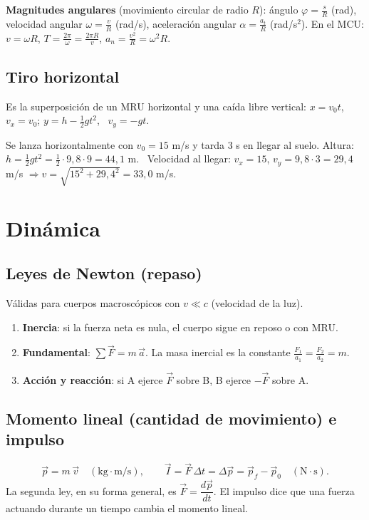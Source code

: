 \documentclass[11pt,a4paper]{article}
\begin{document}
\textbf{Magnitudes angulares} (movimiento circular de radio $R$): ángulo $\varphi=\frac sR$ (rad), velocidad angular $\omega=\frac vR$ (rad/s), aceleración angular $\alpha=\frac{a_t}{R}$ (rad/s$^2$). En el MCU: $v=\omega R$, $T=\frac{2\pi}{\omega}=\frac{2\pi R}{v}$, $a_n=\frac{v^2}{R}=\omega^2R$.

\subsection{Tiro horizontal}
Es la superposición de un MRU horizontal y una caída libre vertical:
$x=v_0t$, \ $v_x=v_0$; \quad $y=h-\tfrac12gt^2$, \ $v_y=-gt$.
\begin{ejemplo}
Se lanza horizontalmente con $v_0=15$ m/s y tarda 3 s en llegar al suelo.
Altura: $h=\frac12gt^2=\frac12\cdot9{,}8\cdot9=44{,}1$ m. \
Velocidad al llegar: $v_x=15$, $v_y=9{,}8\cdot3=29{,}4$ m/s $\Rightarrow v=\sqrt{15^2+29{,}4^2}=33{,}0$ m/s.
\end{ejemplo}

\section{Dinámica}
\subsection{Leyes de Newton (repaso)}
Válidas para cuerpos macroscópicos con $v\ll c$ (velocidad de la luz).
\begin{enumerate}[itemsep=2pt]
  \item \textbf{Inercia}: si la fuerza neta es nula, el cuerpo sigue en reposo o con MRU.
  \item \textbf{Fundamental}: $\sum\vec F=m\,\vec a$. La masa inercial es la constante $\frac{F_1}{a_1}=\frac{F_2}{a_2}=m$.
  \item \textbf{Acción y reacción}: si A ejerce $\vec F$ sobre B, B ejerce $-\vec F$ sobre A.
\end{enumerate}

\subsection{Momento lineal (cantidad de movimiento) e impulso}
\[
\vec p=m\,\vec v\quad(\mathrm{kg\cdot m/s}),\qquad \vec I=\vec F\,\Delta t=\Delta\vec p=\vec p_f-\vec p_0\quad(\mathrm{N\cdot s}).
\]
La segunda ley, en su forma general, es $\vec F=\dfrac{d\vec p}{dt}$. El impulso dice que una fuerza actuando durante un tiempo cambia el momento lineal.
\end{document}
